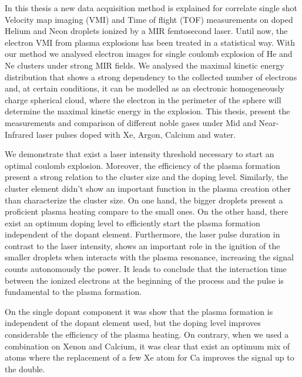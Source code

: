 \documentclass[a4paper,12pt,bibtotocnumbered, twosite]{scrreprt}
\begin{document}
In this thesis a new data acquisition method is explained  for correlate single shot Velocity map imaging (VMI) and Time of flight (TOF) measurements on doped Helium and Neon droplets ionized by a MIR femtosecond laser. Until now, the electron VMI from plasma explosions has been treated in a statistical way. With our method we analysed electron images for single coulomb explosion of He and Ne clusters under strong MIR fields. 
We analysed the maximal kinetic energy distribution that shows a strong dependency to the collected number of electrons and, at certain conditions, it can be modelled as an electronic  homogeneously charge spherical cloud, where the electron in the perimeter of the sphere will determine the maximal kinetic energy in the explosion. This thesis, present the measurements and comparison of different noble gases under Mid and Near-Infrared laser pulses doped with Xe, Argon, Calcium and water.

We demonstrate that exist a laser intensity threshold necessary to start an optimal coulomb explosion. Moreover, the efficiency of the plasma formation present a strong relation to the cluster size and the doping level. Similarly, the cluster element didn't show an important function in the plasma creation other than characterize the cluster size. On one hand, the bigger droplets present a proficient plasma heating compare to the small ones. On the other hand, there exist an optimum doping level to efficiently start the plasma formation independent of the dopant element. Furthermore, the laser pulse duration in contrast to the laser intensity, shows an important role in the ignition of the smaller droplets when interacts with the plasma resonance, increasing the signal counts autonomously the power. It leads to conclude that the interaction time between  the ionized electrons at the beginning of the process and the pulse is fundamental to the plasma formation.

On the single dopant component it was show that the plasma  formation is independent of the dopant element used, but the doping level improves considerable the efficiency of the plasma heating. On contrary, when we used a combination on Xenon and Calcium, it was clear that exist an optimum mix of atoms where the replacement of a few Xe atom for Ca improves the signal up to the double.
\newpage

\tableofcontents
\end{document}
